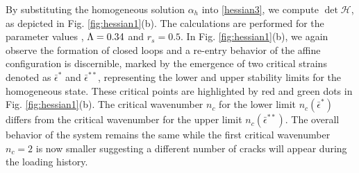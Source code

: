 By substituting the homogeneous solution $\alpha_h$ into \eqref{hessian3}, we compute $\det \mathcal{H}$, as depicted  in Fig. \ref{fig:hessian1}(b). The calculations are performed for the parameter values , $\Lambda=0.34$ and $r_s=0.5$.  In Fig. \ref{fig:hessian1}(b), we again observe the formation of closed loops and a re-entry behavior of the affine configuration is discernible, marked by the emergence of two critical strains denoted as $\bar\epsilon^*$ and $\bar\epsilon^{**}$, representing the lower and upper stability limits for the homogeneous state. These critical points are highlighted by red and green dots in Fig. \ref{fig:hessian1}(b). The critical wavenumber $n_c$ for the lower limit $n_c(\bar{\epsilon}^*)$    differs from the critical wavenumber for the upper limit $n_c(\bar{\epsilon}^{**})$. The overall behavior of the system remains the same while the first critical wavenumber $n_c=2$ is now smaller suggesting a different number of cracks will appear during the loading history.


